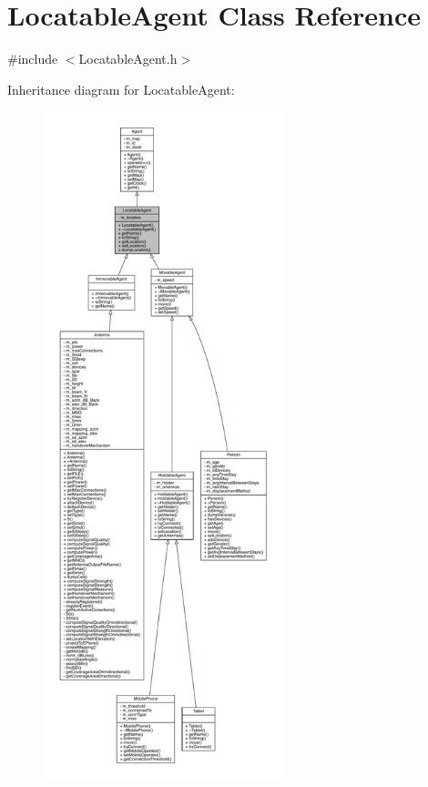 \hypertarget{class_locatable_agent}{}\section{Locatable\+Agent Class Reference}
\label{class_locatable_agent}


{\ttfamily \#include $<$Locatable\+Agent.\+h$>$}



Inheritance diagram for Locatable\+Agent\+:
\nopagebreak
\begin{figure}[H]
\begin{center}
\leavevmode
\includegraphics[height=550pt]{class_locatable_agent__inherit__graph}
\end{center}
\end{figure}


